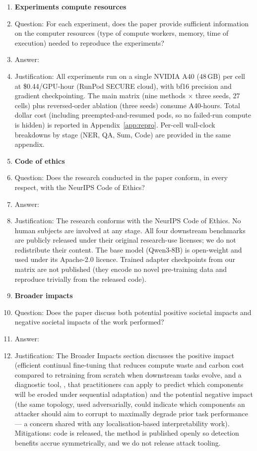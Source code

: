 \begin{enumerate}
\item {\bf Experiments compute resources}
    \item[] Question: For each experiment, does the paper provide sufficient information on the computer resources (type of compute workers, memory, time of execution) needed to reproduce the experiments?
    \item[] Answer: \answerYes{}
    \item[] Justification: All experiments run on a single NVIDIA A40 (48\,GB) per cell at \$0.44/GPU-hour (RunPod SECURE cloud), with bf16 precision and gradient checkpointing. The main matrix (nine methods $\times$ three seeds, 27 cells) plus reversed-order ablation (three seeds) consume  A40-hours. Total dollar cost (including preempted-and-resumed pods, so no failed-run compute is hidden) is reported in Appendix~\ref{app:repro}. Per-cell wall-clock breakdowns by stage (NER, QA, Sum, Code) are provided in the same appendix.

\item {\bf Code of ethics}
    \item[] Question: Does the research conducted in the paper conform, in every respect, with the NeurIPS Code of Ethics?
    \item[] Answer: \answerYes{}
    \item[] Justification: The research conforms with the NeurIPS Code of Ethics. No human subjects are involved at any stage. All four downstream benchmarks are publicly released under their original research-use licenses; we do not redistribute their content. The base model (Qwen3-8B) is open-weight and used under its Apache-2.0 licence. Trained adapter checkpoints from our matrix are not published (they encode no novel pre-training data and reproduce trivially from the released code).

\item {\bf Broader impacts}
    \item[] Question: Does the paper discuss both potential positive societal impacts and negative societal impacts of the work performed?
    \item[] Answer: \answerYes{}
    \item[] Justification: The Broader Impacts section discusses the positive impact (efficient continual fine-tuning that reduces compute waste and carbon cost compared to retraining from scratch when downstream tasks evolve, and a diagnostic tool, \fvs{}, that practitioners can apply to predict which components will be eroded under sequential adaptation) and the potential negative impact (the same topology, used adversarially, could indicate which components an attacker should aim to corrupt to maximally degrade prior task performance --- a concern shared with any localisation-based interpretability work). Mitigations: code is released, the method is published openly so detection benefits accrue symmetrically, and we do not release attack tooling.


\end{enumerate}
